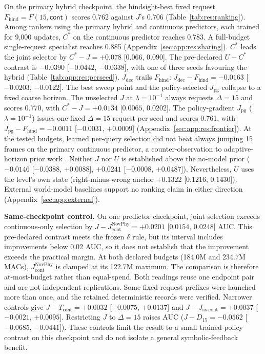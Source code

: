 \begin{revblock}
\nopagebreak
On the primary hybrid checkpoint, the hindsight-best fixed request $F_{\mathrm{hind}}=F(15,\textsf{cont})$ scores 0.762 against $J$'s 0.706 (Table~\ref{tab:res:ranking}). Among rankers using the primary hybrid and continuous predictors, each trained for 9,000 updates, $C^{*}$ on the continuous predictor reaches 0.783. A full-budget single-request specialist reaches 0.885 (Appendix~\ref{sec:app:res:sharing}). $C^{*}$ leads the joint selector by $C^{*}-J=+0.078$ [$0.066$, $0.090$]. The pre-declared $U-C^{*}$ contrast is $-0.0390$ [$-0.0442$, $-0.0338$], with one of three seeds favouring the hybrid (Table~\ref{tab:app:res:perseed}). $J_{\mathrm{dec}}$ trails $F_{\mathrm{hind}}$: $J_{\mathrm{dec}}-F_{\mathrm{hind}}=-0.0163$ [$-0.0203$, $-0.0122$]. The best sweep point and the policy-selected $J_{\mathrm{pg}}$ collapse to a fixed coarse horizon. The unselected $J$ at $\lambda=10^{-1}$ always requests $\Delta=15$ and scores 0.770, with $C^{*}-J=+0.0134$ [$0.0065$, $0.0202$]. The policy-gradient $J_{\mathrm{pg}}$ ($\lambda=10^{-1}$) issues one fixed $\Delta=15$ request per seed and scores 0.761, with $J_{\mathrm{pg}}-F_{\mathrm{hind}}=-0.0011$ [$-0.0031$, $+0.0009$] (Appendix~\ref{sec:app:res:frontier}). At the tested budgets, learned per-query selection did not beat always jumping 15 frames on the primary continuous predictor, a counter-observation to adaptive-horizon prior work \citep{neitz2018adaptive,chatterjee2025improving}. Neither $J$ nor $U$ is established above the no-model prior ($-0.0146$ [$-0.0388$, $+0.0088$], $+0.0241$ [$-0.0008$, $+0.0487$]). Nevertheless, $U$ uses the level's own state (right-minus-wrong anchor $+0.1322$ [$0.1216$, $0.1430$]). External world-model baselines support no ranking claim in either direction (Appendix~\ref{sec:app:external}).

\textbf{Same-checkpoint control.} On one predictor checkpoint, joint selection exceeds continuous-only selection by $J-J_{\mathrm{cont}}^{\mathrm{NovPhy}}=+0.0201$ [$0.0154$, $0.0248$] AUC. This pre-declared contrast meets the frozen $\delta$ rule, but its interval includes improvements below 0.02 AUC, so it does not establish that the improvement exceeds the practical margin. At both declared budgets (184.0M and 234.7M MACs), $J_{\mathrm{cont}}^{\mathrm{NovPhy}}$ is clamped at its 122.7M maximum. The comparison is therefore at-most-budget rather than equal-spend. Both readings reuse one endpoint pair and are not independent replications. Some fixed-request prefixes were launched more than once, and the retained deterministic records were verified. Narrower controls give $J-T_{\textsf{cont}}=+0.0032$ [$-0.0075$, $+0.0137$] and $J-J_{\text{as-cont}}=+0.0037$ [$-0.0021$, $+0.0095$]. Restricting $J$ to $\Delta=15$ raises AUC ($J-D_{15}=-0.0562$ [$-0.0685$, $-0.0441$]). These controls limit the result to a small trained-policy contrast on this checkpoint and do not isolate a general symbolic-feedback benefit.


\end{revblock}
